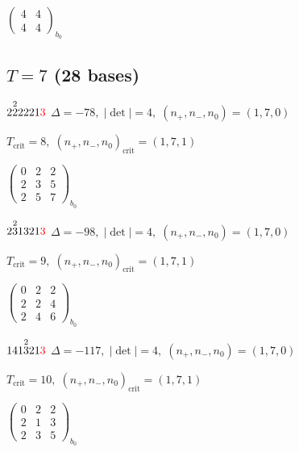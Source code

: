 \documentclass[10pt]{article}
\begin{document}
\hspace{2em}$\left(\begin{smallmatrix}4 & 4 \\ 4 & 4\end{smallmatrix}\right)_{\!b_0}$


\subsection*{$T = 7$ \quad (28 bases)}
\smallskip

$2\overset{2}{2}2221\textcolor{red}{3}$ \quad $\Delta=-78,\; |\det|=4,\; (n_+,n_-,n_0)=(1,7,0)$

\hspace{1em}$T_{\text{crit}}=8,\; (n_+,n_-,n_0)_{\text{crit}}=(1,7,1)$

\hspace{2em}$\left(\begin{smallmatrix}0 & 2 & 2 \\ 2 & 3 & 5 \\ 2 & 5 & 7\end{smallmatrix}\right)_{\!b_0}$

\smallskip

$2\overset{2}{3}1321\textcolor{red}{3}$ \quad $\Delta=-98,\; |\det|=4,\; (n_+,n_-,n_0)=(1,7,0)$

\hspace{1em}$T_{\text{crit}}=9,\; (n_+,n_-,n_0)_{\text{crit}}=(1,7,1)$

\hspace{2em}$\left(\begin{smallmatrix}0 & 2 & 2 \\ 2 & 2 & 4 \\ 2 & 4 & 6\end{smallmatrix}\right)_{\!b_0}$

\smallskip

$141\overset{2}{3}21\textcolor{red}{3}$ \quad $\Delta=-117,\; |\det|=4,\; (n_+,n_-,n_0)=(1,7,0)$

\hspace{1em}$T_{\text{crit}}=10,\; (n_+,n_-,n_0)_{\text{crit}}=(1,7,1)$

\hspace{2em}$\left(\begin{smallmatrix}0 & 2 & 2 \\ 2 & 1 & 3 \\ 2 & 3 & 5\end{smallmatrix}\right)_{\!b_0}$
\end{document}
